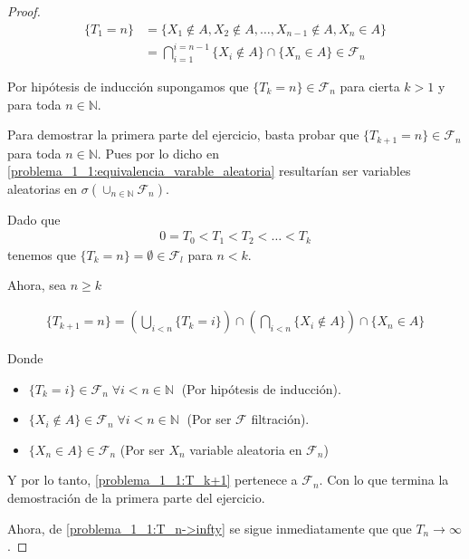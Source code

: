 \begin{proof}
	\begin{align}
			\{T_1 = n\} 	&=	\{ X_1 \not\in A, X_2 \not\in A, \dots, X_{n-1} \not\in A, X_n \in A \} \\
							&= 	\bigcap_{i=1}^{i=n-1} \{ X_i \not\in A \} \cap \{X_n \in A \} \in \mathscr{F}_n
	\end{align}\pn
 
	Por hipótesis de inducción supongamos que $\{T_k = n\} \in \mathscr{F}_n$ para cierta $k>1$ 
	y para toda $n \in \mathbb{N}$.\pn

	Para demostrar la primera parte del ejercicio, basta probar que $\{T_{k+1} = n\} \in \mathscr{F}_n$ para 
	toda $n \in \mathbb{N}$. Pues por lo dicho en \eqref{problema_1_1:equivalencia_varable_aleatoria} resultarían ser 
	variables aleatorias en $\sigma(\cup_{n \in \mathbb{N}} \mathscr{F}_n)$.\pn
	
	Dado que 
	\begin{align}\label{problema_1_1:T_n->infty}
		0=T_0<T_1<T_2<\dots<T_k
	\end{align}  
	tenemos que $\{ T_k = n\} = \emptyset \in \mathscr{F}_l$ para $n < k$.\pn
	
	Ahora, sea $n \geq k$
	
	\begin{align}\label{problema_1_1:T_k+1}
		\{ T_{k+1} = n\} = 
		\left( \bigcup_{i < n } \{T_k = i \} \right) 
		\cap 
		\left( \bigcap_{i < n} \{ X_i \not\in A \} \right)
		\cap
		\{ X_n \in A\}
	\end{align}
	
	
	Donde 
	\begin{itemize}
		\item	 $\{ T_k = i\} \in \mathscr{F}_n \; \forall i < n \in \mathbb{N} \; $ (Por hipótesis de inducción).	
		\item	 $\{ X_i \not \in A\} \in \mathscr{F}_n \; \forall i < n \in \mathbb{N} \;$ (Por ser $\mathscr{F}$ filtración).
		\item $\{ X_n \in A\} \in \mathscr{F}_n$ (Por ser $X_n$ variable aleatoria en $\mathscr{F}_n$)	
	\end{itemize}
	
	Y por lo tanto, \eqref{problema_1_1:T_k+1} pertenece a $\mathscr{F}_n$. Con lo que termina la demostración de la primera parte del ejercicio.\pn
	
	Ahora, de \eqref{problema_1_1:T_n->infty} se sigue inmediatamente que que $T_n \rightarrow \infty$.
\end{proof}